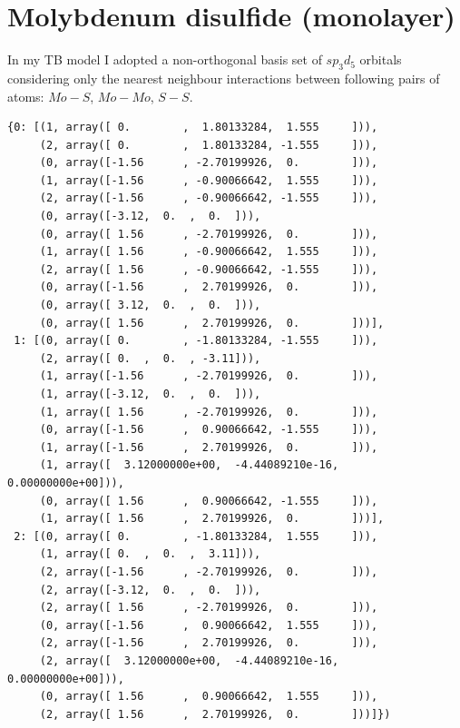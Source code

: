 \documentclass{my_pracamgr}
\begin{document}
\section{Molybdenum disulfide (monolayer)}
In my TB model I adopted a non-orthogonal basis set of $sp_3 d_5$ orbitals considering only the nearest neighbour interactions between following pairs of atoms: $Mo - S$, $Mo-Mo$, $S-S$.
\begin{minipage}{\linewidth}
\begin{verbatim}
{0: [(1, array([ 0.        ,  1.80133284,  1.555     ])), 
     (2, array([ 0.        ,  1.80133284, -1.555     ])), 
     (0, array([-1.56      , -2.70199926,  0.        ])), 
     (1, array([-1.56      , -0.90066642,  1.555     ])), 
     (2, array([-1.56      , -0.90066642, -1.555     ])), 
     (0, array([-3.12,  0.  ,  0.  ])), 
     (0, array([ 1.56      , -2.70199926,  0.        ])), 
     (1, array([ 1.56      , -0.90066642,  1.555     ])), 
     (2, array([ 1.56      , -0.90066642, -1.555     ])), 
     (0, array([-1.56      ,  2.70199926,  0.        ])), 
     (0, array([ 3.12,  0.  ,  0.  ])), 
     (0, array([ 1.56      ,  2.70199926,  0.        ]))], 
 1: [(0, array([ 0.        , -1.80133284, -1.555     ])), 
     (2, array([ 0.  ,  0.  , -3.11])), 
     (1, array([-1.56      , -2.70199926,  0.        ])), 
     (1, array([-3.12,  0.  ,  0.  ])), 
     (1, array([ 1.56      , -2.70199926,  0.        ])), 
     (0, array([-1.56      ,  0.90066642, -1.555     ])), 
     (1, array([-1.56      ,  2.70199926,  0.        ])), 
     (1, array([  3.12000000e+00,  -4.44089210e-16,   0.00000000e+00])), 
     (0, array([ 1.56      ,  0.90066642, -1.555     ])), 
     (1, array([ 1.56      ,  2.70199926,  0.        ]))],
 2: [(0, array([ 0.        , -1.80133284,  1.555     ])), 
     (1, array([ 0.  ,  0.  ,  3.11])), 
     (2, array([-1.56      , -2.70199926,  0.        ])), 
     (2, array([-3.12,  0.  ,  0.  ])), 
     (2, array([ 1.56      , -2.70199926,  0.        ])), 
     (0, array([-1.56      ,  0.90066642,  1.555     ])), 
     (2, array([-1.56      ,  2.70199926,  0.        ])), 
     (2, array([  3.12000000e+00,  -4.44089210e-16,   0.00000000e+00])), 
     (0, array([ 1.56      ,  0.90066642,  1.555     ])), 
     (2, array([ 1.56      ,  2.70199926,  0.        ]))]})
\end{verbatim}
\end{minipage}
\end{document}
